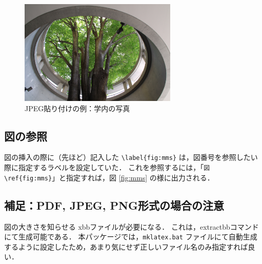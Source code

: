 \begin{figure}[H]
\centering
\includegraphics[height=5cm]{DEF059.jpg}
\caption{JPEG貼り付けの例：学内の写真}
\label{fig:sagamiC}
\end{figure}

\subsection{図の参照}
図の挿入の際に（先ほど）記入した \verb+\label{fig:mms}+ は，図番号を参照したい際に指定するラベルを設定していた．
これを参照するには，「\verb+図 \ref{fig:mms}+」と指定すれば，図 \ref{fig:mms} の様に出力される．

\subsection*{補足：PDF, JPEG, PNG形式の場合の注意}
図の大きさを知らせる xbbファイルが必要になる．
これは，extractbbコマンドにて生成可能である．
本パッケージでは，\verb+mklatex.bat+ ファイルにて自動生成するように設定したため，あまり気にせず正しいファイル名のみ指定すれば良い．
